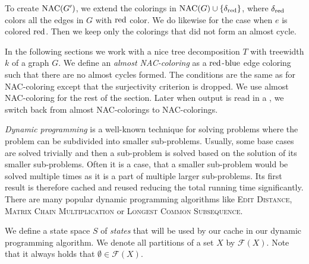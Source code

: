 To create \( \operatorname{NAC}(G') \), we extend the colorings
in \( \operatorname{NAC}(G) \cup \{ \delta_{\text{red}} \} \), where \( \delta_{\text{red}} \)
colors all the edges in \( G \) with \( \text{red} \) color.
We do likewise for the case when \( e \) is colored \( \text{red} \).
Then we keep only the colorings that did not form an almost cycle.

In the following sections
we work with a nice tree decomposition \( T \) with treewidth \( k \)
of a graph \( G \).
%
We define an \emph{almost NAC-coloring}
as a \( \text{red} \)-\( \text{blue} \) edge coloring such that there
are no almost cycles formed. The conditions are the same as for NAC-coloring
except that the surjectivity criterion is dropped.
We use almost NAC-coloring for the rest of the section.
Later when output is read in a \RootNode{},
we switch back from almost NAC-colorings to NAC-colorings.

\emph{Dynamic programming} is a well-known technique for solving problems
where the problem can be subdivided into smaller sub-problems.
Usually, some base cases are solved trivially and then a sub-problem
is solved based on the solution of its smaller sub-problems.
Often it is a case, that a smaller sub-problem would be solved multiple times
as it is a part of multiple larger sub-problems.
Its first result is therefore cached and reused reducing the total running time significantly.
There are many popular dynamic programming algorithms
like \textsc{Edit Distance}, \textsc{Matrix Chain Multiplication} or \textsc{Longest Common Subsequence}.

We define a state space \( S \) of \emph{states}
that will be used by our cache in our dynamic programming algorithm.
We denote all partitions of a set \( X \) by \( \mathcal{F}(X) \).
Note that it always holds that \( \emptyset \in \mathcal{F}(X) \).

